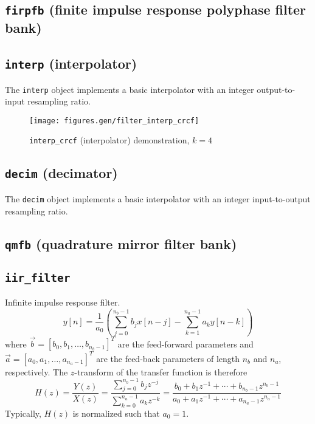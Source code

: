 \subsection{{\tt firpfb} (finite impulse response polyphase filter bank)}

\subsection{{\tt interp} (interpolator)}
The {\tt interp} object implements a basic interpolator with an integer
output-to-input resampling ratio.



\begin{figure}
\centering
  \texttt{[image: figures.gen/filter\_interp\_crcf]}
\caption{{\tt interp\_crcf} (interpolator) demonstration, $k=4$}
\label{fig:module:filter:interp_crcf}
\end{figure}


\subsection{{\tt decim} (decimator)}
The {\tt decim} object implements a basic interpolator with an integer
input-to-output resampling ratio.

\subsection{{\tt qmfb} (quadrature mirror filter bank)}

\subsection{{\tt iir\_filter}}
Infinite impulse response filter.
\[
    y[n] = \frac{1}{a_0} \left(
           \sum_{j=0}^{n_b-1}{ b_j x[n-j] } -
           \sum_{k=1}^{n_a-1}{ a_k y[n-k] }
           \right)
\]
where $\vec{b} = [b_0,b_1,\ldots,b_{n_b-1}]^T$ are the feed-forward parameters
and   $\vec{a} = [a_0,a_1,\ldots,a_{n_a-1}]^T$ are the feed-back parameters
of length $n_b$ and $n_a$, respectively.
The $z$-transform of the transfer function is therefore
\[
    H(z) = \frac{Y(z)}{X(z)}
         = \frac{\sum\limits_{j=0}^{n_b-1}{b_j z^{-j}}}
                {\sum\limits_{k=0}^{n_a-1}{a_k z^{-k}}}
         = \frac{ b_0 + b_1 z^{-1} + \cdots + b_{n_b-1} z^{n_b-1}}
                { a_0 + a_1 z^{-1} + \cdots + a_{n_a-1} z^{n_a-1}}
\]
Typically, $H(z)$ is normalized such that $a_0=1$.

